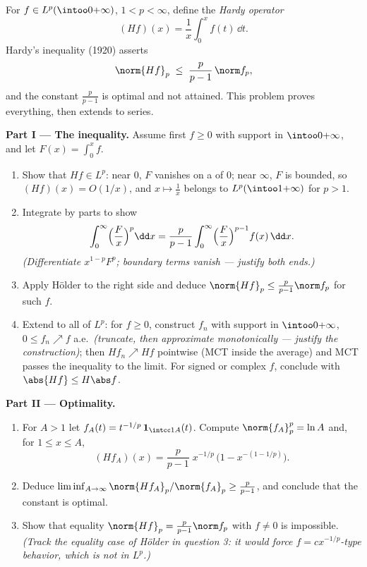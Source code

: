 \begin{problem}\label{pb:b3:lp:1}
For $f \in L^p(\intoo0{+\infty})$, $1 < p < \infty$, define
the \emph{Hardy operator}
\[
(Hf)(x) = \frac1x\int_0^x f(t)\,\dd t .
\]
Hardy's inequality (1920) asserts
\[
\norm{Hf}_p \;\leq\; \frac{p}{p-1}\,\norm f_p ,
\]
and the constant $\frac p{p-1}$ is optimal and not attained.
This problem proves everything, then extends to series.

\medskip
\noindent\textbf{Part I --- The inequality.} Assume first $f
\geq 0$  with  support in
$\intoo0{+\infty}$, and let $F(x) = \int_0^xf$.
\begin{enumerate}
  \item Show that $Hf \in L^p$: near $0$, $F$ vanishes on a
         of $0$; near $\infty$, $F$ is bounded, so
        $(Hf)(x) = O(1/x)$, and $x \mapsto \frac1x$ belongs to
        $L^p(\intoo1{+\infty})$ for $p > 1$.
  \item Integrate by parts to show
        \[
        \int_0^\infty \Bigl(\frac Fx\Bigr)^p\dd x
        = \frac{p}{p-1}\int_0^\infty\Bigl(\frac
        Fx\Bigr)^{p-1}f(x)\,\dd x .
        \]
        \emph{(Differentiate $x^{1-p}F^p$; boundary terms
        vanish --- justify both ends.)}
  \item Apply H\"older to the right side and deduce
        $\norm{Hf}_p \leq \frac p{p-1}\norm f_p$ for such $f$.
  \item Extend to all of $L^p$: for $f \geq 0$, construct
        $f_n$  with  support in
        $\intoo0{+\infty}$, $0 \leq f_n \nearrow f$ a.e.\
        \emph{(truncate, then approximate monotonically ---
        justify the construction)}; then $Hf_n \nearrow Hf$
        pointwise (MCT inside the average) and MCT passes the
        inequality to the limit. For signed or complex $f$,
        conclude with $\abs{Hf} \leq H\abs f$.
\end{enumerate}

\medskip
\noindent\textbf{Part II --- Optimality.}
\begin{enumerate}[resume]
  \item For $A > 1$ let $f_A(t) = t^{-1/p}\,\mathbf
        1_{\intcc1A}(t)$. Compute $\norm{f_A}_p^p = \ln A$
        and, for $1 \leq x \leq A$,
        \[
        (Hf_A)(x) = \frac p{p-1}\;x^{-1/p}\,
        \bigl(1 - x^{-(1 - 1/p)}\bigr).
        \]
  \item Deduce $\liminf_{A\to\infty} \norm{Hf_A}_p/
        \norm{f_A}_p \geq \frac{p}{p-1}$, and conclude that
        the constant is optimal.
  \item Show that equality $\norm{Hf}_p = \frac
        p{p-1}\norm f_p$ with $f \neq 0$ is impossible.
        \emph{(Track the equality case of H\"older in question
        3: it would force $f = cx^{-1/p}$-type behavior, which
        is not in $L^p$.)}
\end{enumerate}


\end{problem}
